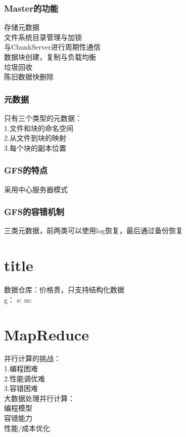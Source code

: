 \documentclass{article}
\begin{document}
\begin{CJK}{UTF8}{gbsn}
	\subsubsection*{Master的功能}
	存储元数据\\
	文件系统目录管理与加锁\\
	与ChunkServer进行周期性通信\\
	数据块创建，复制与负载均衡\\
	垃圾回收\\
	陈旧数据快删除\\
	\subsubsection*{元数据}
	只有三个类型的元数据：\\
	1.文件和块的命名空间\\
	2.从文件到块的映射\\
	3.每个块的副本位置\\
	\subsubsection*{GFS的特点}
	采用中心服务器模式\\
	
	
	\subsubsection*{GFS的容错机制}
	三类元数据，前两类可以使用log恢复，最后通过备份恢复\\
	
	
	\section*{title}
	数据仓库：价格贵，只支持结构化数据\\
	
	
	g：
	s:
	m:
	
	
	\section*{MapReduce}
	并行计算的挑战：\\
	1.编程困难\\
	2.性能调优难\\
	3.容错困难\\
	大数据处理并行计算：\\
	编程模型\\
	容错能力\\
	性能/成本优化\\

\end{CJK}
\end{document}
